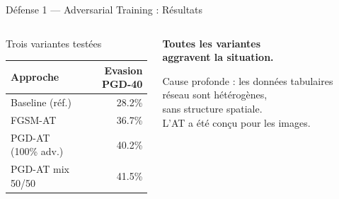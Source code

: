 \documentclass[aspectratio=169,11pt]{beamer}
\begin{document}
\begin{frame}{D\'efense 1 --- Adversarial Training : R\'esultats}
\begin{columns}[T]
\begin{block}{Trois variantes test\'ees}
\normalsize
\begin{tabular}{lr}
\toprule
\textbf{Approche} & \textbf{Evasion PGD-40} \\
\midrule
Baseline (r\'ef.)       & 28.2\% \\
\midrule
\rowcolor{myred!15}
FGSM-AT                 & \alert{36.7\%} \\
\rowcolor{myred!22}
PGD-AT (100\% adv.)     & \alert{40.2\%} \\
\rowcolor{myred!32}
PGD-AT mix 50/50        & \alert{41.5\%} \\
\bottomrule
\end{tabular}
\end{block}

\vspace{1.5em}
\begin{center}
{\Large\textcolor{myred}{\textbf{Toutes les variantes\\aggravent la situation.}}}

\vspace{1.5em}
\normalsize
Cause profonde : les donn\'ees tabulaires r\'eseau sont h\'et\'erog\`enes,\\
sans structure spatiale.\\
L'AT a \'et\'e con\c{c}u pour les images.
\end{center}
\end{columns}
\end{frame}
\end{document}
